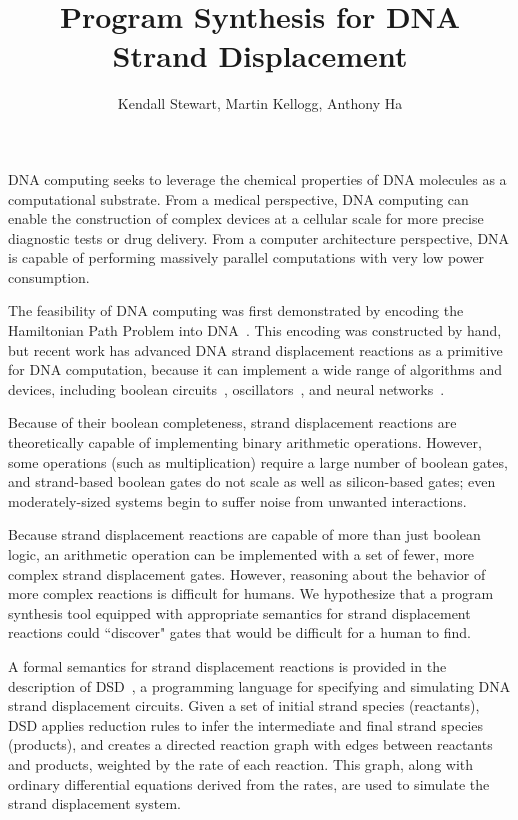 \documentclass{article}
\begin{document}
\title{Program Synthesis for DNA Strand Displacement}
\author{Kendall Stewart, Martin Kellogg, Anthony Ha}

\maketitle

DNA computing seeks to leverage the chemical properties
of DNA molecules as a computational substrate.
From a medical perspective, DNA computing can enable the
construction of complex devices at a cellular scale for more precise
diagnostic tests or drug delivery. From a computer architecture perspective,
DNA is capable of performing massively parallel computations with very low
power consumption.

The feasibility of DNA computing was first demonstrated by encoding the
Hamiltonian Path Problem into DNA~\cite{adelman}. This encoding was constructed
by hand, but recent work has advanced DNA strand displacement reactions as a
primitive for DNA computation, because it can implement a wide
range of algorithms and devices, including boolean circuits~\cite{strands},
oscillators~\cite{dsd}, and neural networks~\cite{strandnn}.

Because of their boolean completeness, strand displacement reactions are
theoretically capable of implementing binary arithmetic operations. However,
some operations (such as multiplication) require a large number of
boolean gates, and strand-based boolean gates do not scale as well as
silicon-based gates; even moderately-sized systems begin to suffer noise
from unwanted interactions.

Because strand displacement reactions are capable of more than just boolean
logic, an arithmetic operation can be implemented with a set of
fewer, more complex strand displacement gates. However, reasoning about the
behavior of more complex reactions is difficult for humans. We hypothesize that
a program synthesis tool equipped with appropriate semantics for strand
displacement reactions could ``discover" gates that would be difficult for a
human to find.

A formal semantics for strand displacement reactions is provided in the
description of DSD~\cite{dsd}, a programming language for specifying and
simulating DNA strand displacement circuits. Given a set of initial strand
species (reactants), DSD applies reduction rules to infer the intermediate and
final strand species (products), and creates a directed reaction graph with
edges between reactants and products, weighted by the rate of each reaction.
This graph, along with ordinary differential equations derived from the rates,
are used to simulate the strand displacement system.
\end{document}
